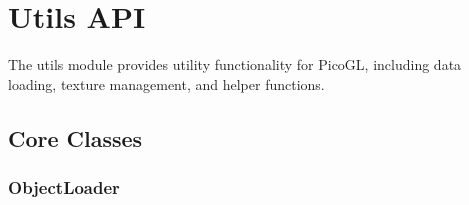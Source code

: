 \documentclass[a4paper,10pt,english,openany,oneside]{sphinxmanual}
\begin{document}
\sphinxstepscope


\section{Utils API}
\label{\detokenize{api/utils:utils-api}}\label{\detokenize{api/utils::doc}}
\sphinxAtStartPar
The utils module provides utility functionality for PicoGL, including data loading, texture management, and helper functions.


\subsection{Core Classes}
\label{\detokenize{api/utils:core-classes}}

\subsubsection{ObjectLoader}
\label{\detokenize{api/utils:objectloader}}
\end{document}
